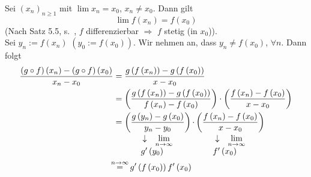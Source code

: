 \begin{beweis}{}
Sei $\left( x_n\right)_{n\geq 1}$ mit $\lim x_n=x_0$, $x_n\not=x_0$. Dann gilt
\[\lim f\left( x_n\right) = f\left( x_0\right)\]
(Nach Satz 5.5, s.~\pageref{satz5.5},  $f$ differenzierbar $\Rightarrow$ $f$ stetig (in $x_0$)).\\

\noindent Sei $y_n:=f\left( x_n\right)$ $\left( y_0:=f\left( x_0\right)\right)$. Wir nehmen an, dass $y_n\not=f\left( x_0\right)$, $\forall n$. Dann folgt
\begin{align*}
\frac{{\left( {g \circ f} \right)\left( {{x_n}} \right) - \left( {g \circ f} \right)\left( {{x_0}} \right)}}{{{x_n} - {x_0}}} &= \frac{{g\left( {f\left( {{x_n}} \right)} \right) - g\left( {f\left( {{x_0}} \right)} \right)}}{{x - {x_0}}}\\
&= \left( {\frac{{g\left( {f\left( {{x_n}} \right)} \right) - g\left( {f\left( {{x_0}} \right)} \right)}}{{f\left( {{x_n}} \right) - f\left( {{x_0}} \right)}}} \right) \cdot \left( {\frac{{f\left( {{x_n}} \right) - f\left( {{x_0}} \right)}}{{x - {x_0}}}} \right)\\
& = \mathop {\left( {\frac{{g\left( {{y_n}} \right) - g\left( {{x_0}} \right)}}{{{y_n} - {y_0}}}} \right)}\limits_{\begin{array}{*{20}{c}}
{\begin{array}{*{20}{c}}
 \downarrow &{\mathop {\lim }\limits_{n \to \infty } }
\end{array}}\\
{\begin{array}{*{20}{c}}
{g'\left( {{y_0}} \right)}&{{\text{         }}}
\end{array}}
\end{array}}  \cdot \mathop {\left( {\frac{{f\left( {{x_n}} \right) - f\left( {{x_0}} \right)}}{{x - {x_0}}}} \right)}\limits_{\begin{array}{*{20}{c}}
{\begin{array}{*{20}{c}}
 \downarrow &{\mathop {\lim }\limits_{n \to \infty } }
\end{array}}\\
{\begin{array}{*{20}{c}}
{f'\left( {{x_0}} \right)}&{{\text{         }}}
\end{array}}
\end{array}} \\
&\hspace{-1.5mm}\mathop  = \limits^{n \to \infty } g'\left( {f\left( {{x_0}} \right)} \right)f'\left( {{x_0}} \right)
\end{align*}
\end{beweis}
